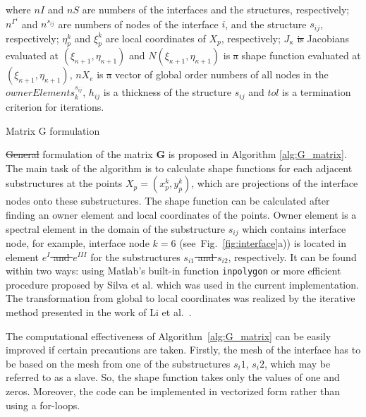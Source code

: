 \documentclass[materials,article,submit,moreauthors,pdftex]{Definitions/mdpi}
\providecommand{\DIFadd}[1]{{\protect\color{blue}{#1}}} %
\providecommand{\DIFdel}[1]{{\protect\color{red}\sout{#1}}}                      %
\providecommand{\DIFaddbegin}{} %
\providecommand{\DIFaddend}{} %
\providecommand{\DIFdelbegin}{} %
\providecommand{\DIFdelend}{} %
\begin{document}
\begin{algorithm}[H]
{{		}
	}
where \(nI\) and \(nS\) are numbers of the interfaces and the structures, respectively; \(n^{\Gamma^i}\) and \(n^{s_{ij}}\) are numbers of nodes of the interface \(i\), and the structure \(s_{ij}\), respectively; \(\eta^k_p\) and  \(\xi^k_p\) are local coordinates of \(X_p\), respectively; \(J_{\kappa}\) \DIFdelbegin \DIFdel{is }\DIFdelend \DIFaddbegin \DIFadd{are }\DIFaddend Jacobians evaluated at \((\xi_{\kappa+1},\eta_{\kappa+1})\) and \(N(\xi_{\kappa+1},\eta_{\kappa+1})\) is \DIFdelbegin \DIFdel{a }\DIFdelend \DIFaddbegin \DIFadd{the }\DIFaddend shape function evaluated at \((\xi_{\kappa+1},\eta_{\kappa+1})\), \(nX_e\) is \DIFdelbegin \DIFdel{a }\DIFdelend \DIFaddbegin \DIFadd{the }\DIFaddend vector of global order numbers of all nodes in the \(ownerElements^{s_{ij}}_k\), \(h_{ij}\) is a thickness of the structure \(s_{ij}\) and \(tol\) is a termination criterion for iterations.
	\caption{Matrix G formulation}
	\label{alg:G_matrix}
\end{algorithm}
\DIFdelbegin \DIFdel{General }\DIFdelend \DIFaddbegin \DIFadd{The general }\DIFaddend formulation of the matrix \textbf{G} is proposed in Algorithm \ref{alg:G_matrix}.
The main task of the algorithm is to calculate shape functions for each adjacent substructures at the points \(X_p=(x_p^k,y_p^k)\), which are projections of the interface nodes onto these substructures.
The shape function can be calculated after finding an owner element and local coordinates of the points.
Owner element is a spectral element in the domain of the substructure \(s_{ij}\) which contains interface node, for example, interface node \DIFdelbegin \DIFdel{\(k=6\) }\DIFdelend \DIFaddbegin \DIFadd{\(k_\Gamma=36\) }\DIFaddend (see~Fig.~\ref{fig:interface}a)) is located in element \DIFdelbegin \DIFdel{\(e^I\) and \(e^{III}\) }\DIFdelend \DIFaddbegin \DIFadd{\(e^{I}_{3D}\) and \(e^{III}_{2D}\) }\DIFaddend for the substructures \DIFdelbegin \DIFdel{\(s_{i1}\) and \(s_{i2}\)}\DIFdelend \DIFaddbegin \DIFadd{\(s_{11}\) and \(s_{12}\)}\DIFaddend , respectively.
It can be found within two ways: using Matlab's built-in function \verb+inpolygon+ or more efficient procedure proposed by Silva et al. \cite{silva2009exact} which was used in the current implementation.
The transformation from global to local coordinates was realized by the iterative method presented in the work of Li et al.~\cite{li2014efficient}.

The computational effectiveness of Algorithm~\ref{alg:G_matrix} can be easily improved if certain precautions are taken.
Firstly, the mesh of the interface has to be based on the mesh from one of the substructures \(s_i1\), \(s_i2\), which may be referred to as a slave.
So, the shape function takes only the values of one and zeros.
Moreover, the code can be implemented in vectorized form rather than using a for-loops.
\end{document}
